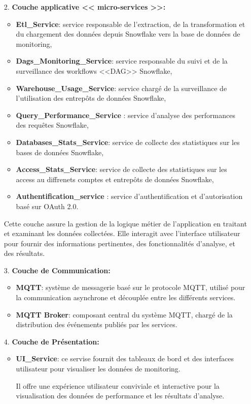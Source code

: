 \begin{enumerate}
         \item[2.] \textbf{Couche applicative << micro-services >>:}
                \begin{itemize}
                \item \textbf{Etl\_Service}: service responsable de l'extraction, de la transformation et du chargement des données depuis Snowflake vers la base de données de monitoring,
                \item \textbf{Dags\_Monitoring\_Service}: service responsable du suivi et de la surveillance des workflows <<DAG>> Snowflake,
                \item \textbf{Warehouse\_Usage\_Service}: service chargé de la surveillance de l'utilisation des entrepôts de données Snowflake,
                \item \textbf{Query\_Performance\_Service }: service d'analyse des performances des requêtes Snowflake,
                \item \textbf{Databases\_Stats\_Service}: service de collecte des statistiques sur les bases de données Snowflake,
                \item \textbf{Access\_Stats\_Service}: service de collecte des statistiques sur les access au diffrenets comptes et entrepôts de données Snowflake,
                \item \textbf{Authentification\_service }: service d'authentification et d'autorisation basé sur OAuth 2.0.
            \end{itemize}
                \par Cette couche assure la gestion de la logique métier de l'application en traitant et examinant les données collectées.
                Elle interagit avec l'interface utilisateur pour fournir des informations pertinentes, des fonctionnalités d'analyse, et des résultats.
        \item[3.] \textbf{Couche de Communication: }
                \begin{itemize}
                    \item \textbf{MQTT}: système de messagerie basé sur le protocole MQTT, utilisé pour la communication asynchrone et découplée entre les différents services.
                    \item \textbf{MQTT Broker}: composant central du système MQTT, chargé de la distribution des événements publiés par les services.
                \end{itemize}
            
        \item[4.] \textbf{Couche de Présentation:}
            \begin{itemize}
                \item \textbf{UI\_Service}: ce servise fournit des tableaux de bord et des interfaces utilisateur pour visualiser les données de monitoring.
                \par Il offre une expérience utilisateur conviviale et interactive pour la visualisation des données de performance et les résultats d'analyse.
            \end{itemize}
    \end{enumerate}
